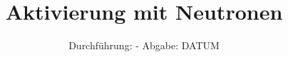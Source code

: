 

\subject{V702}
\title{Aktivierung mit Neutronen}
\date{%
  Durchführung: -
  \hspace{3em}
  Abgabe: DATUM
}



\maketitle
\thispagestyle{empty}
\tableofcontents
\newpage







\printbibliography{}


